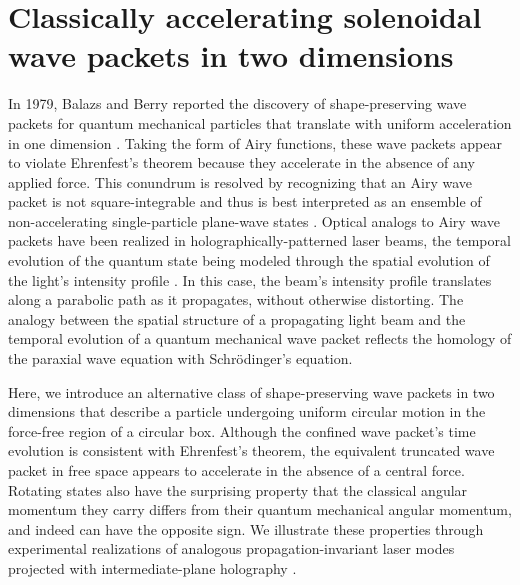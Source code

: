 \chapter{Classically accelerating solenoidal wave packets in two dimensions}
\label{ch:accelerating}


In 1979, Balazs and Berry reported the discovery of
shape-preserving wave packets for quantum mechanical particles
that translate with uniform
acceleration in one dimension \cite{balazs79}.
Taking the form of Airy functions, these wave packets
appear to violate Ehrenfest's theorem because
they accelerate in the absence of any applied force.
This conundrum is resolved by recognizing that an
Airy wave packet is not
square-integrable and thus is best interpreted as an 
ensemble of non-accelerating single-particle plane-wave states \cite{balazs79,ballentine94}.
Optical analogs to Airy wave packets
have been realized in holographically-patterned laser beams,
the temporal evolution of the quantum state being modeled through
the spatial evolution of the light's intensity profile
\cite{siviloglou07,siviloglou07a,kaminer12}.
In this case, the beam's intensity profile translates
along a parabolic path as it propagates, without
otherwise distorting.
The analogy between the spatial structure of a propagating
light beam and the temporal evolution of a quantum
mechanical wave packet reflects the homology of 
the paraxial wave equation with Schr\"odinger's equation.

Here, we introduce an alternative class of shape-preserving wave
packets in two dimensions that describe a particle undergoing
uniform circular motion
in the force-free region of a circular box.
Although the confined wave packet's time evolution is consistent with
Ehrenfest's theorem, the equivalent truncated wave packet in free
space appears to accelerate in the absence of a central force.
Rotating states also have the surprising property that
the classical angular momentum they carry
differs from their quantum mechanical angular momentum,
and indeed can have the opposite sign.
We illustrate these properties through experimental realizations
of analogous propagation-invariant laser modes projected
with intermediate-plane
holography \cite{mondal18}.

